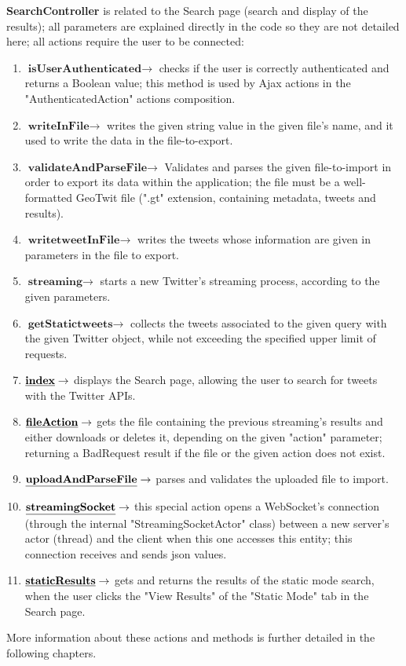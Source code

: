 \documentclass[a4paper,11pt]{report}
\begin{document}
\textbf{SearchController} is related to the Search page (search and display of the results); all parameters are explained directly in the code so they are not detailed here; all actions require the user to be connected:
\begin{enumerate}
\item $\textbf{isUserAuthenticated}\to$ checks if the user is correctly authenticated and returns a Boolean value; this method is used by Ajax actions in the "AuthenticatedAction" actions composition.
\item $\textbf{writeInFile}\to$ writes the given string value in the given file's name, and it used to write the data in the file-to-export.
\item $\textbf{validateAndParseFile}\to$ Validates and parses the given file-to-import in order to export its data within the application; the file must be a well-formatted GeoTwit file (".gt" extension, containing metadata, tweets and results).
\item $\textbf{writetweetInFile}\to$ writes the tweets whose information are given in parameters in the file to export.
\item $\textbf{streaming}\to$ starts a new Twitter's streaming process, according to the given parameters.
\item $\textbf{getStatictweets}\to$ collects the tweets associated to the given query with the given Twitter object, while not exceeding the specified upper limit of requests.
\item $\textbf{\underline{index}}\to$ displays the Search page, allowing the user to search for tweets with the Twitter APIs.
\item $\textbf{\underline{fileAction}}\to$ gets the file containing the previous streaming's results and either downloads or deletes it, depending on the given "action" parameter; returning a BadRequest result if the file or the given action does not exist.
\item $\textbf{\underline{uploadAndParseFile}}\to$ parses and validates the uploaded file to import.
\item $\textbf{\underline{streamingSocket}}\to$ this special action opens a WebSocket's connection (through the internal "StreamingSocketActor" class) between a new server's actor (thread) and the client when this one accesses this entity; this connection receives and sends json values.
\item $\textbf{\underline{staticResults}}\to$ gets and returns the results of the static mode search, when the user clicks the "View Results" of the "Static Mode" tab in the Search page.
\end{enumerate}
More information about these actions and methods is further detailed in the following chapters.
\bigskip
\end{document}
